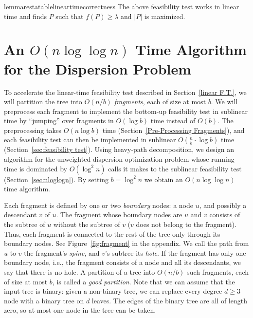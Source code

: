 \documentclass[a4paper,UKenglish]{lipics-v2016}
\theoremstyle{plain}
\begin{document}
\begin{restatable}{lemmarestatable}{lineartimecorrectness}
\label{lineartimecorrectness}
The above feasibility test works in linear time and finds $P$ such that $f(P)\geq\lambda$ and $|P|$ is maximized.
\end{restatable}

\section{An \texorpdfstring{\boldmath$O(n\log\log n)$}{O(nloglogn)} Time Algorithm for the Dispersion Problem}
\label{sublinear f.t.}

To accelerate the linear-time feasibility test described in Section~\ref{linear F.T.}, we will partition the tree into $O(n/b)$ {\em fragments}, each of size at most
$b$. We will preprocess each fragment to implement the bottom-up feasibility test in sublinear time by  ``jumping'' over fragments in $O(\log b)$ time instead of $O(b)$.  The preprocessing takes $O(n\log b)$ time (Section~\ref{Pre-Processing Fragments}), and each feasibility test can then be implemented in sublinear $O(\frac{n}{b} \cdot \log b)$ time (Section~\ref{sec:feasibility test}). Using heavy-path decomposition, we design an algorithm for the unweighted dispersion optimization problem whose running time is dominated by $O(\log^{2}n)$ calls it makes to the sublinear feasibility test  (Section~\ref{sec:nloglogn}). By setting $b=\log^{2}n$ we obtain an $O(n\log\log n)$ time algorithm.


Each fragment is defined by one or two {\em boundary} nodes: a node $u$, and possibly a descendant $v$ of $u$. The fragment whose boundary nodes are $u$ and $v$ consists of the subtree of $u$ without the subtree of $v$ ($v$ does not belong to the fragment). Thus, each fragment is connected to the rest of the tree only through its boundary nodes. See Figure~\ref{fig:fragment} in the appendix. 
We call the path from $u$ to $v$ the fragment's \textit{spine}, and $v$'s subtree its \textit{hole}. If the
fragment has only one boundary node, i.e., the fragment consists of a node and all its descendants, we say that there is no hole.
A partition of a tree into $O(n/b)$ such fragments, each of size at most $b$, is called a \emph{good partition}.
Note that we can assume that the input tree is binary: given a non-binary tree, we can replace every degree $d\geq 3$ node with a binary tree on
$d$ leaves. The edges of the binary tree are all of length zero, so at most one node in the tree can be taken.
\end{document}
